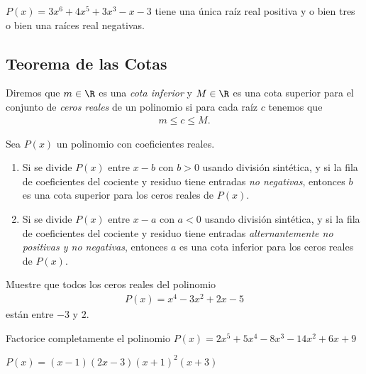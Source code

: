 \begin{solucion}
	$P(x)= 3x^{6}+4x^{5}+3x^{3}-x-3$ tiene una única raíz real positiva y o bien tres o bien una raíces real negativas.
\end{solucion}


\subsection{Teorema de las Cotas}
{}
Diremos que $m\in \R$ es una \emph{cota inferior} y $M\in \R$ es una cota superior para el conjunto de \emph{ceros reales} de un polinomio si para cada raíz $c$ tenemos que 
\begin{align*}
	m \leq c \leq M.
\end{align*}


{}
\begin{teorema}
Sea $P(x)$ un polinomio con coeficientes reales.
\begin{enumerate}
\item Si se divide $P(x)$ entre $x-b$ con $b>0$ usando división sintética, y si la fila de coeficientes del cociente y residuo tiene entradas \emph{no negativas}, entonces $b$ es una cota superior para los ceros reales de $P(x)$.
\item Si se divide $P(x)$ entre $x-a$ con $a<0$ usando división sintética, y si la fila de coeficientes del cociente y residuo tiene entradas \emph{alternantemente no positivas y no negativas}, entonces $a$ es una cota inferior para los ceros reales de $P(x)$.
\end{enumerate}

\end{teorema}


{}
	\begin{problema}
		Muestre que todos los ceros reales del polinomio \begin{align*}
			P(x)=x^4-3x^{2}+2x-5
		\end{align*}
		están entre $-3$ y $2$.
	\end{problema}


{}
	\begin{problema}
		
		Factorice completamente el polinomio 
		$P(x)=2x^{5}+5x^{4}-8x^{3}-14x^{2}+6x+9$
	\end{problema}

\begin{solucion}
	$P(x)=\left( x-1 \right)\left( 2x-3 \right)\left( x+1 \right)^{2}\left( x+3 \right)$
\end{solucion}



